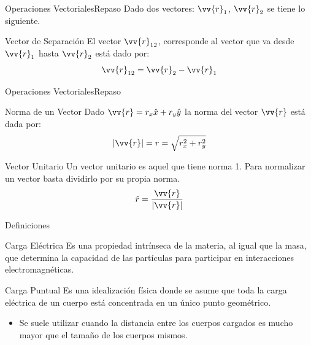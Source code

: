 \documentclass[10pt, aspectratio=169]{beamer}
\begin{document}
\primeraDiapo

\begin{frame}{Operaciones Vectoriales}{Repaso}
    Dado dos vectores: $\vv{r}_1$, $\vv{r}_2$ se tiene lo siguiente.
    \begin{boxTeoria}{Vector de Separación}
        El vector $\vv{r}_{12}$, corresponde al vector que va desde $\vv{r}_1$ hasta $\vv{r}_2$ está dado por:
        \begin{equation*}
            \vv{r}_{12} = \vv{r}_2 - \vv{r}_1
        \end{equation*}
    \end{boxTeoria}
\end{frame}

\begin{frame}{Operaciones Vectoriales}{Repaso}
    \vspace{-15pt}
    \begin{boxTeoria}{Norma de un Vector}
        Dado $\vv{r} = r_x\hat{x} + r_y\hat{y}$ la norma del vector $\vv{r}$ está dada por:
        \begin{equation*}
            |\vv{r}| = r = \sqrt{r_x^2 + r_y^2}
        \end{equation*}
    \end{boxTeoria}

    \begin{boxTeoria}{Vector Unitario}
        Un vector unitario es aquel que tiene norma 1. Para normalizar un vector basta dividirlo por su propia norma.
        \begin{equation*}
            \hat{r} = \frac{\vv{r}}{|\vv{r}|}
        \end{equation*}
    \end{boxTeoria}
\end{frame}

\begin{frame}{Definiciones}

    \begin{boxTeoria}{Carga Eléctrica}
        Es una propiedad intrínseca de la materia, al igual que la masa, que determina la capacidad de las partículas para participar en interacciones electromagnéticas.
    \end{boxTeoria}

    \begin{boxTeoria}{Carga Puntual}
        Es una idealización física donde se asume que toda la carga eléctrica de un cuerpo está concentrada en un único punto geométrico.
        \begin{itemize}
            \item Se suele utilizar cuando la distancia entre los cuerpos cargados es mucho mayor que el tamaño de los cuerpos mismos.
        \end{itemize}
    \end{boxTeoria}

\end{frame}
\end{document}
